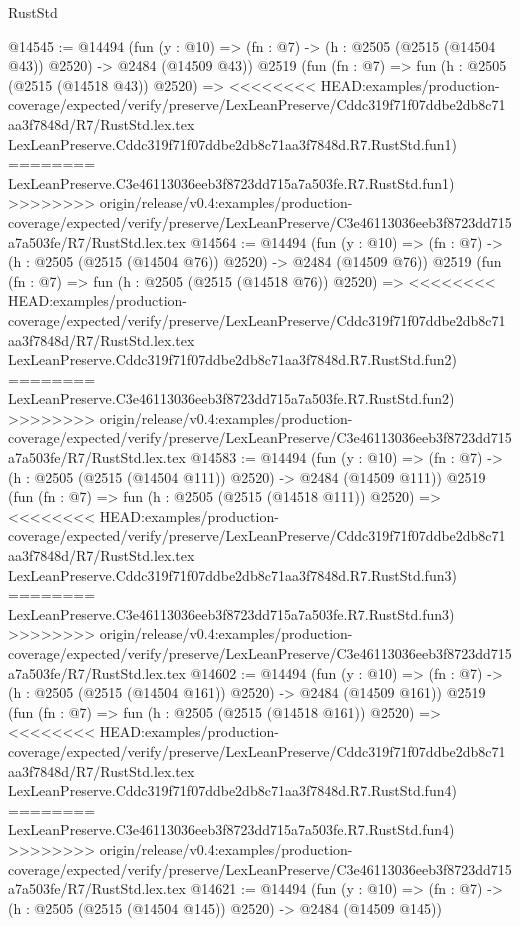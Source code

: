 \begin{lexlean}{RustStd}
\begin{coremodule}
{\begin{coremodule}
{{{{{{{{{{{{{{{{{{{{@14545 := @14494
    (fun (y : @10) => (fn : @7) -> (h : @2505 (@2515 (@14504 @43)) @2520) -> @2484 (@14509 @43))
    @2519
    (fun (fn : @7) =>
    fun (h : @2505 (@2515 (@14518 @43)) @2520) =>
<<<<<<<< HEAD:examples/production-coverage/expected/verify/preserve/LexLeanPreserve/Cddc319f71f07ddbe2db8c71aa3f7848d/R7/RustStd.lex.tex
    LexLeanPreserve.Cddc319f71f07ddbe2db8c71aa3f7848d.R7.RustStd.fun1)
========
    LexLeanPreserve.C3e46113036eeb3f8723dd715a7a503fe.R7.RustStd.fun1)
>>>>>>>> origin/release/v0.4:examples/production-coverage/expected/verify/preserve/LexLeanPreserve/C3e46113036eeb3f8723dd715a7a503fe/R7/RustStd.lex.tex
@14564 := @14494
    (fun (y : @10) => (fn : @7) -> (h : @2505 (@2515 (@14504 @76)) @2520) -> @2484 (@14509 @76))
    @2519
    (fun (fn : @7) =>
    fun (h : @2505 (@2515 (@14518 @76)) @2520) =>
<<<<<<<< HEAD:examples/production-coverage/expected/verify/preserve/LexLeanPreserve/Cddc319f71f07ddbe2db8c71aa3f7848d/R7/RustStd.lex.tex
    LexLeanPreserve.Cddc319f71f07ddbe2db8c71aa3f7848d.R7.RustStd.fun2)
========
    LexLeanPreserve.C3e46113036eeb3f8723dd715a7a503fe.R7.RustStd.fun2)
>>>>>>>> origin/release/v0.4:examples/production-coverage/expected/verify/preserve/LexLeanPreserve/C3e46113036eeb3f8723dd715a7a503fe/R7/RustStd.lex.tex
@14583 := @14494
    (fun (y : @10) => (fn : @7) -> (h : @2505 (@2515 (@14504 @111)) @2520) -> @2484 (@14509 @111))
    @2519
    (fun (fn : @7) =>
    fun (h : @2505 (@2515 (@14518 @111)) @2520) =>
<<<<<<<< HEAD:examples/production-coverage/expected/verify/preserve/LexLeanPreserve/Cddc319f71f07ddbe2db8c71aa3f7848d/R7/RustStd.lex.tex
    LexLeanPreserve.Cddc319f71f07ddbe2db8c71aa3f7848d.R7.RustStd.fun3)
========
    LexLeanPreserve.C3e46113036eeb3f8723dd715a7a503fe.R7.RustStd.fun3)
>>>>>>>> origin/release/v0.4:examples/production-coverage/expected/verify/preserve/LexLeanPreserve/C3e46113036eeb3f8723dd715a7a503fe/R7/RustStd.lex.tex
@14602 := @14494
    (fun (y : @10) => (fn : @7) -> (h : @2505 (@2515 (@14504 @161)) @2520) -> @2484 (@14509 @161))
    @2519
    (fun (fn : @7) =>
    fun (h : @2505 (@2515 (@14518 @161)) @2520) =>
<<<<<<<< HEAD:examples/production-coverage/expected/verify/preserve/LexLeanPreserve/Cddc319f71f07ddbe2db8c71aa3f7848d/R7/RustStd.lex.tex
    LexLeanPreserve.Cddc319f71f07ddbe2db8c71aa3f7848d.R7.RustStd.fun4)
========
    LexLeanPreserve.C3e46113036eeb3f8723dd715a7a503fe.R7.RustStd.fun4)
>>>>>>>> origin/release/v0.4:examples/production-coverage/expected/verify/preserve/LexLeanPreserve/C3e46113036eeb3f8723dd715a7a503fe/R7/RustStd.lex.tex
@14621 := @14494
    (fun (y : @10) => (fn : @7) -> (h : @2505 (@2515 (@14504 @145)) @2520) -> @2484 (@14509 @145))
}}}}}}}}}}}}}}}}}}}}
\end{coremodule}}
\end{coremodule}
\end{lexlean}
